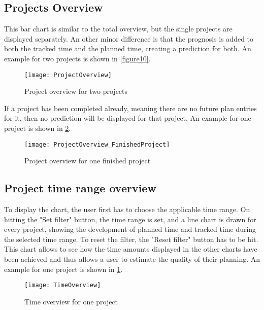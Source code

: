 \subsection{Projects Overview}
This bar chart is similar to the total overview, but the single projects are displayed separately. An other minor difference is that the prognosis is added to both the tracked time and the planned time, creating a prediction for both. An example for two projects is shown in \ref{figure10}.
\begin{figure}[H]
	\centering
	\texttt{[image: ProjectOverview]}
	\caption{Project overview for two projects}
	\label{figure11}
\end{figure}
If a project has been completed already, meaning there are no future plan entries for it, then no prediction will be displayed for that project. An example for one project is shown in \ref{figure12}.
\begin{figure}[H]
	\centering
	\texttt{[image: ProjectOverview\_FinishedProject]}
	\caption{Project overview for one finished project}
	\label{figure12}
\end{figure}

\subsection{Project time range overview}
To display the chart, the user first has to choose the applicable time range. On hitting the "Set filter" button, the time range is set, and a line chart is drawn for every project, showing the development of planned time and tracked time during the selected time range. To reset the filter, the "Reset filter" button has to be hit. This chart allows to see how the time amounts displayed in the other charts have been achieved and thus allows a user to estimate the quality of their planning. An example for one project is shown in \ref{figure11}.
\begin{figure}[H]
	\centering
	\texttt{[image: TimeOverview]}
	\caption{Time overview for one project}
	\label{figure13}
\end{figure}

